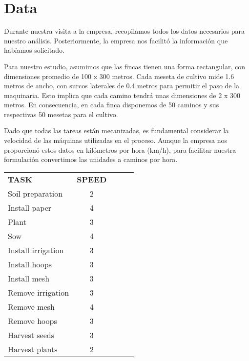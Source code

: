 
\chapter*{Data}

Durante nuestra visita a la empresa, recopilamos todos los datos necesarios para nuestro análisis. 
Posteriormente, la empresa nos facilitó la información que habíamos solicitado.

Para nuestro estudio, asumimos que las fincas tienen una forma rectangular, con dimensiones promedio
 de 100 x 300 metros. Cada meseta de cultivo mide 1.6 metros de ancho, con surcos laterales de 0.4 metros
  para permitir el paso de la maquinaria. Esto implica que cada camino tendrá unas dimensiones de 2 x 300 metros.
   En consecuencia, en cada finca disponemos de 50 caminos y sus respectivas 50 mesetas para el cultivo.

Dado que todas las tareas están mecanizadas, es fundamental considerar la velocidad de las máquinas utilizadas en el
 proceso. Aunque la empresa nos proporcionó estos datos en kilómetros por hora (km/h), para facilitar nuestra formulación 
 convertimos las unidades a caminos por hora.
 
 \begin{table}[ht!]
    \begin{tabular}{lclll}
    \textbf{TASK}      & \multicolumn{1}{l}{\textbf{SPEED}} \\
    Soil preparation   & 2                                  \\
    Install paper      & 4                                  \\
    Plant              & 3                                  \\
    Sow                & 4                                  \\
    Install irrigation & 3                                  \\
    Install hoops      & 3                                  \\
    Install mesh       & 3                                  \\
    Remove irrigation  & 3                                  \\
    Remove mesh        & 4                                  \\
    Remove hoops       & 3                                  \\
    Harvest seeds      & 3                                  \\
    Harvest plants     & 2                                            
    \end{tabular}
    \end{table}

